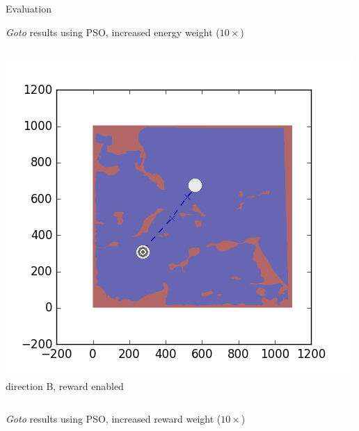 \documentclass[9pt]{beamer}
\begin{document}
\begin{frame}{Evaluation}
\begin{block}{\textit{Goto} results using PSO, increased energy weight ($10\times$)}
\begin{columns}
\begin{column}{0.25\textwidth}
\begin{center}
                    \includegraphics[width=\textwidth,trim={2cm 2cm 2cm 2cm},clip]{img/EXP3RG_PathAb_-1_-1_0d001_-1.png}
                    \newline
                    \tiny{direction B, reward enabled}
                \end{center}
            \end{column}
        \end{columns}
    \end{block}
    \begin{block}{\textit{Goto} results using PSO, increased reward weight ($10\times$)}
        \begin{columns}
            \begin{column}{0.25\textwidth}
                \begin{center}

\end{center}
\end{column}
\end{columns}
\end{block}
\end{frame}
\end{document}
